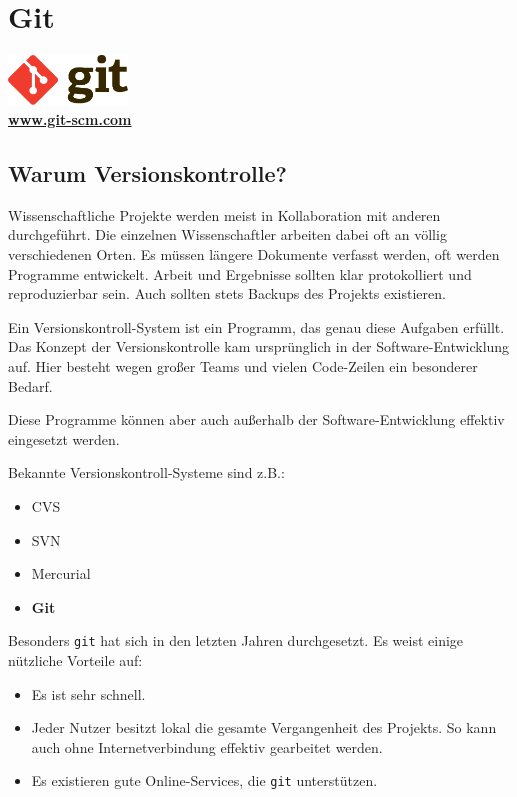 \chapter{Git}
\begin{center}
    \includegraphics[width=120px]{img/git.pdf} \\
    \textbf{\href{http://git-scm.com}{www.git-scm.com}}
\end{center}

\section{Warum Versionskontrolle?}
Wissenschaftliche Projekte werden meist in Kollaboration mit anderen durchgeführt.
Die einzelnen Wissenschaftler arbeiten dabei oft an völlig verschiedenen Orten.
Es müssen längere Dokumente verfasst werden, oft werden Programme entwickelt.
Arbeit und Ergebnisse sollten klar protokolliert und reproduzierbar sein.
Auch sollten stets Backups des Projekts existieren.

Ein Versionskontroll-System ist ein Programm, das genau diese Aufgaben erfüllt.
Das Konzept der Versionskontrolle kam ursprünglich in der Software-Entwicklung auf.
Hier besteht wegen großer Teams und vielen Code-Zeilen ein besonderer Bedarf.

Diese Programme können aber auch außerhalb der Software-Entwicklung effektiv eingesetzt werden.

Bekannte Versionskontroll-Systeme sind z.B.:
\begin{itemize}
  \item CVS
  \item SVN
  \item Mercurial
  \item \textbf{Git}
\end{itemize}

Besonders \texttt{git} hat sich in den letzten Jahren durchgesetzt.
Es weist einige nützliche Vorteile auf:
\begin{itemize}
  \item Es ist sehr schnell.
  \item Jeder Nutzer besitzt lokal die gesamte Vergangenheit des Projekts.
    So kann auch ohne Internetverbindung effektiv gearbeitet werden.
  \item Es existieren gute Online-Services, die \texttt{git} unterstützen.
\end{itemize}


